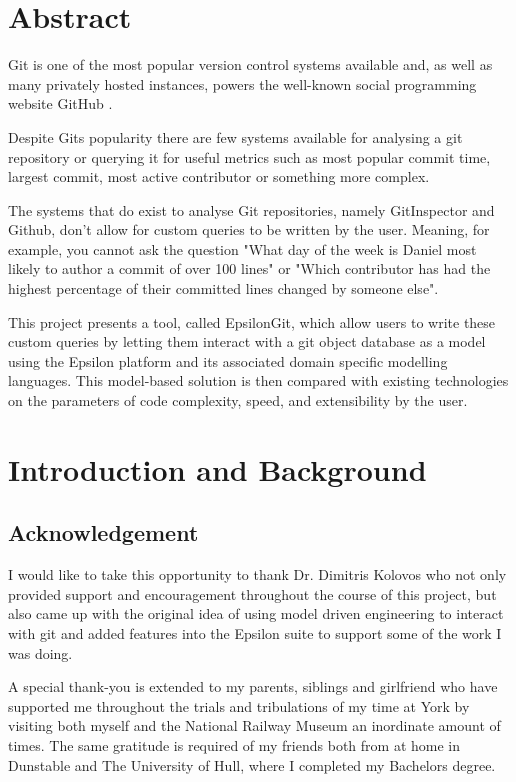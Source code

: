 \documentclass[11pt]{book}
\begin{document}
\chapter*{\centering Abstract}
\begin{center}
	\parbox{350pt}{
Git is one of the most popular version control systems available \cite{gitpopularity} and, as well as many privately hosted instances, powers the well-known social programming website GitHub \cite{gitpowersgithub}.

Despite Gits popularity there are few systems available for analysing a git repository or querying it for useful metrics such as most popular commit time, largest commit, most active contributor or something more complex.

The systems that do exist to analyse Git repositories, namely GitInspector \cite{gitinspector} and Github, don't allow for custom queries to be written by the user. Meaning, for example, you cannot ask the question "What day of the week is Daniel most likely to author a commit of over 100 lines" or "Which contributor has had the highest percentage of their committed lines changed by someone else". 

This project presents a tool, called EpsilonGit, which allow users to write these custom queries by letting them interact with a git object database as a model using the Epsilon platform and its associated domain specific modelling languages. This model-based solution is then compared with existing technologies on the parameters of code complexity, speed, and extensibility by the user.
}
\end{center}

\tableofcontents

\chapter{Introduction and Background}
\label{introandbackground}
\section{Acknowledgement}
I would like to take this opportunity to thank Dr. Dimitris Kolovos who not only provided support and encouragement throughout the course of this project, but also came up with the original idea of using model driven engineering to interact with git and added features into the Epsilon suite to support some of the work I was doing.

A special thank-you is extended to my parents, siblings and girlfriend who have supported me throughout the trials and tribulations of my time at York by visiting both myself and the National Railway Museum an inordinate amount of times. The same gratitude is required of my friends both from at home in Dunstable and The University of Hull, where I completed my Bachelors degree. %
\end{document}
